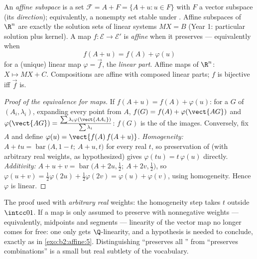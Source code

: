 \begin{definition}\label{def:b2:affine:subspace}
An \emph{affine subspace} is a set $\mathcal{F} = A + F = \{A + u :
u \in F\}$ with $F$ a vector subspace (its \emph{direction});
equivalently, a nonempty set stable under . Affine
subspaces of $\R^n$ are exactly the solution sets of linear systems
$MX = B$ (Year 1: particular solution plus kernel). A map $f \colon
\mathcal{E} \to \mathcal{E}'$ is \emph{affine}
when it preserves  --- equivalently when
\[
f(A + u) = f(A) + \varphi(u)
\]
for a (unique) linear map $\varphi = \vec f$, the \emph{linear
part}. Affine maps of $\R^n$: $X \mapsto MX + C$. Compositions are
affine with composed linear parts; $f$ is bijective iff $\vec f$
is.
\end{definition}

\begin{proof}[Proof of the equivalence for maps]
If $f(A + u) = f(A) + \varphi(u)$: for a  $G$ of $(A_i,
\lambda_i)$, expanding every point from $A$, $f(G) = f(A) +
\varphi(\vect{AG})$ and $\varphi(\vect{AG}) =
\frac{\sum\lambda_i\varphi(\vect{AA_i})}{\sum\lambda_i}$: $f(G)$ is
the  of the images. Conversely, fix $A$ and define
$\varphi(u) = \vect{f(A)\,f(A + u)}$. \emph{Homogeneity:} $A + tu =
\operatorname{bar}\bigl(A, 1-t;\ A + u, t\bigr)$ for every real
$t$, so preservation of  (with arbitrary real weights,
as hypothesized) gives $\varphi(tu) = t\,\varphi(u)$ directly.
\emph{Additivity:} $A + u + v = \operatorname{bar}\bigl(A + 2u,
\tfrac12;\ A + 2v, \tfrac12\bigr)$, so $\varphi(u + v) =
\tfrac12\varphi(2u) + \tfrac12\varphi(2v) = \varphi(u) +
\varphi(v)$, using homogeneity. Hence $\varphi$ is linear.
\end{proof}

\begin{remark}
The proof used  with \emph{arbitrary real}
weights: the homogeneity step takes $t$ outside $\intcc01$.
If a map is only assumed to preserve  with
nonnegative weights --- equivalently, midpoints and segments
--- linearity of the vector map no longer comes for free:
one only gets $\Q$-linearity, and a  hypothesis is
needed to conclude, exactly as in
\cref{exo:b2:affine:5}. Distinguishing ``preserves all
'' from ``preserves  combinations'' is a
small but real subtlety of the  vocabulary.
\end{remark}

